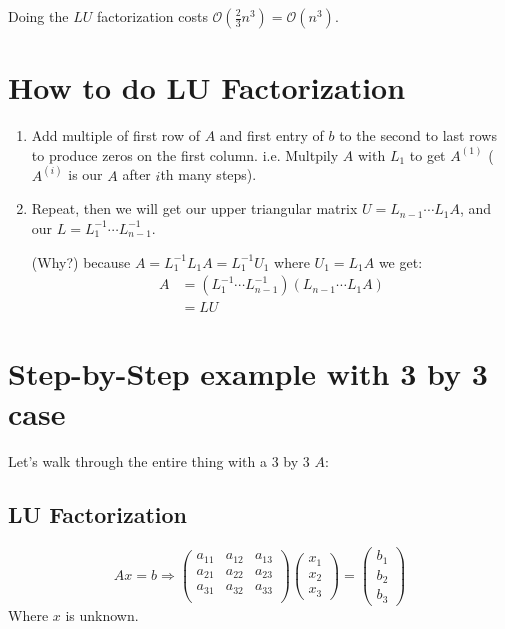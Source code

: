 \noi
Doing the $LU$ factorization costs $\mathcal{O}(\frac{2}{3}n^3) =
\mathcal{O}(n^3)$.
\section{How to do LU Factorization}
\label{sec:hwo}
\begin{enumerate}
\item Add multiple of first row of $A$ and first entry of $b$ to the
  second to last rows to produce zeros on the first
  column. i.e. Multpily $A$ with $L_1$ to get $A^{(1)}$ ($A^{(i)}$ is
  our $A$ after $i$th many steps).
\item Repeat, then we will get our upper triangular matrix 
  $U=L_{n-1}\cdots L_1A$, and our $L=L_{1}^{-1}\cdots
  L_{n-1}^{-1}$.

(Why?) because $A=L_1^{-1}L_1A=L_1^{-1}U_1$ where
$U_1=L_1A$ we get: 
  \begin{align*}
A&= (L_{1}^{-1}\cdots L_{n-1}^{-1})(L_{n-1}\cdots L_1A) \\
&= LU    
  \end{align*}
\end{enumerate}

\section{Step-by-Step example with 3 by 3 case}
\label{sec:example}

Let's walk through the entire thing with a 3 by 3 $A$:

\subsection{LU Factorization}

$$Ax=b \Rightarrow
\begin{pmatrix}
  a_{11}&  a_{12}&  a_{13}\\
  a_{21}&  a_{22}&  a_{23}\\ 
 a_{31}&  a_{32}&  a_{33}\\
\end{pmatrix}
\begin{pmatrix}
  x_1\\ x_2 \\ x_3
\end{pmatrix}
=
\begin{pmatrix}
  b_1\\ b_2 \\ b_3
\end{pmatrix}
$$
Where $x$ is unknown. %

